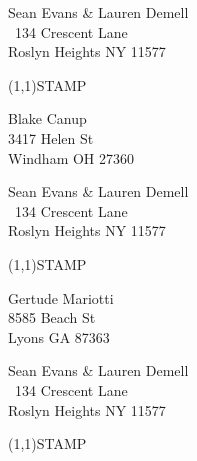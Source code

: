 \documentclass[12pt]{article}
\begin{document}
\begin{minipage}{.5\linewidth} \noindent
Sean Evans \& Lauren Demell\\\ 
134 Crescent Lane\\ 
Roslyn Heights NY 11577
\end{minipage}
\begin{minipage}{.5\linewidth \hspace{-.2in} \vspace{-.3in}}
\begin{flushright}
\framebox(1,1){STAMP}
\end{flushright}
\end{minipage}

\begin{center} \begin{Huge} \vspace*{\fill}
Blake Canup\\
3417 Helen St\\
Windham OH 27360\\
\vspace{\fill} \end{Huge} \end{center}

\clearpage

\begin{minipage}{.5\linewidth} \noindent
Sean Evans \& Lauren Demell\\\ 
134 Crescent Lane\\ 
Roslyn Heights NY 11577
\end{minipage}
\begin{minipage}{.5\linewidth \hspace{-.2in} \vspace{-.3in}}
\begin{flushright}
\framebox(1,1){STAMP}
\end{flushright}
\end{minipage}

\begin{center} \begin{Huge} \vspace*{\fill}
Gertude Mariotti\\
8585 Beach St\\
Lyons GA 87363\\
\vspace{\fill} \end{Huge} \end{center}

\clearpage

\begin{minipage}{.5\linewidth} \noindent
Sean Evans \& Lauren Demell\\\ 
134 Crescent Lane\\ 
Roslyn Heights NY 11577
\end{minipage}
\begin{minipage}{.5\linewidth \hspace{-.2in} \vspace{-.3in}}
\begin{flushright}
\framebox(1,1){STAMP}
\end{flushright}
\end{minipage}
\end{document}
